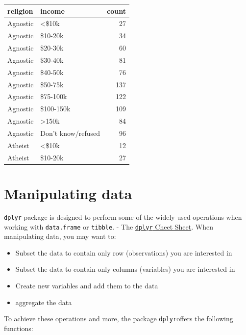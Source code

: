 \documentclass[
  letterpaper,
  DIV=11,
  numbers=noendperiod]{scrreprt}
\providecommand{\tightlist}{%
  \setlength{\itemsep}{0pt}\setlength{\parskip}{0pt}}\usepackage{longtable,booktabs,array}
\begin{document}
\begin{longtable}[]{@{}llr@{}}
\toprule\noalign{}
religion & income & count \\
\midrule\noalign{}
\endhead
\bottomrule\noalign{}
\endlastfoot
Agnostic & \textless\$10k & 27 \\
Agnostic & \$10-20k & 34 \\
Agnostic & \$20-30k & 60 \\
Agnostic & \$30-40k & 81 \\
Agnostic & \$40-50k & 76 \\
Agnostic & \$50-75k & 137 \\
Agnostic & \$75-100k & 122 \\
Agnostic & \$100-150k & 109 \\
Agnostic & \textgreater150k & 84 \\
Agnostic & Don't know/refused & 96 \\
Atheist & \textless\$10k & 12 \\
Atheist & \$10-20k & 27 \\
\end{longtable}

\hypertarget{manipulating-data}{%
\section*{Manipulating data}\label{manipulating-data}}


\texttt{dplyr} package is designed to perform some of the widely used
operations when working with \texttt{data.frame} or \texttt{tibble}. -
The
\href{https://www.rstudio.com/wp-content/uploads/2015/02/data-wrangling-cheatsheet.pdf}{\texttt{dplyr}
Cheet Sheet}. When manipulating data, you may want to:

\begin{itemize}
\tightlist
\item
  Subset the data to contain only row (observations) you are interested
  in
\item
  Subset the data to contain only columns (variables) you are interested
  in
\item
  Create new variables and add them to the data
\item
  aggregate the data
\end{itemize}

To achieve these operations and more, the package \texttt{dplyr}offers
the following functions:
\end{document}
